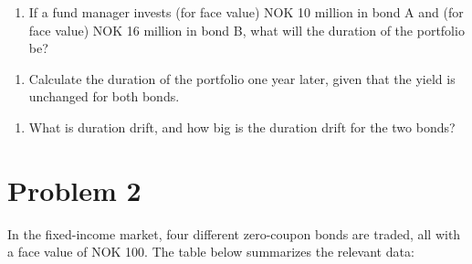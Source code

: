 \documentclass[12]{article}
\begin{document}
\color{black}
\begin{enumerate}
    \item[c)] If a fund manager invests (for face value) NOK 10 million in bond A and (for face value) NOK 16 million in bond B, what will the duration of the portfolio be?
\end{enumerate}




\color{black}
\begin{enumerate}
    \item[d)] Calculate the duration of the portfolio one year later, given that the yield is unchanged for both bonds.
\end{enumerate}

\color{black}
\begin{enumerate}
    \item[d)] What is duration drift, and how big is the duration drift for the two bonds?
\end{enumerate}









\color{black}
\section*{Problem 2}
In the fixed-income market, four different zero-coupon bonds are traded, all with a face value of NOK 100. The table below summarizes the relevant data:

\begin{table}[H]
\centering
{}
\label{tab:my-table}
\end{table}
\end{document}
